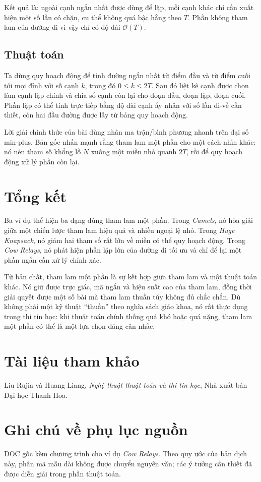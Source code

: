 \documentclass[11pt]{article}
\newcommand{\Oh}{\mathcal{O}}
\begin{document}
Kết quả là: ngoài cạnh ngắn nhất được dùng để lặp, mỗi cạnh khác chỉ cần xuất
hiện một số lần có chặn, cụ thể không quá bậc hằng theo \(T\). Phần không
tham lam của đường đi vì vậy chỉ có độ dài \(\Oh(T)\).

\subsection{Thuật toán}

Ta dùng quy hoạch động để tính đường ngắn nhất từ điểm đầu và từ điểm cuối
tới mọi đỉnh với số cạnh \(k\), trong đó \(0\le k\le 2T\). Sau đó liệt kê
cạnh được chọn làm cạnh lặp chính và chia số cạnh còn lại cho đoạn đầu, đoạn
lặp, đoạn cuối. Phần lặp có thể tính trực tiếp bằng độ dài cạnh ấy nhân với
số lần đi-về cần thiết, còn hai đầu đường được lấy từ bảng quy hoạch động.

Lời giải chính thức của bài dùng nhân ma trận/bình phương nhanh trên đại số
min-plus. Bản gốc nhấn mạnh rằng tham lam một phần cho một cách nhìn khác:
nó nén tham số khổng lồ \(N\) xuống một miền nhỏ quanh \(2T\), rồi để quy
hoạch động xử lý phần còn lại.

\section{Tổng kết}

Ba ví dụ thể hiện ba dạng dùng tham lam một phần. Trong \textit{Camels}, nó
hòa giải giữa một chiến lược tham lam hiệu quả và nhiều ngoại lệ nhỏ. Trong
\textit{Huge Knapsack}, nó giảm hai tham số rất lớn về miền có thể quy hoạch
động. Trong \textit{Cow Relays}, nó phát hiện phần lặp lớn của đường đi tối ưu
và chỉ để lại một phần ngắn cần xử lý chính xác.

Từ bản chất, tham lam một phần là sự kết hợp giữa tham lam và một thuật toán
khác. Nó giữ được trực giác, mã ngắn và hiệu suất cao của tham lam, đồng thời
giải quyết được một số bài mà tham lam thuần túy không đủ chắc chắn. Dù không
phải một kỹ thuật ``thuần'' theo nghĩa sách giáo khoa, nó rất thực dụng trong
thi tin học: khi thuật toán chính thống quá khó hoặc quá nặng, tham lam một
phần có thể là một lựa chọn đáng cân nhắc.

\section*{Tài liệu tham khảo}

Liu Rujia và Huang Liang, \emph{Nghệ thuật thuật toán và thi tin học}, Nhà
xuất bản Đại học Thanh Hoa.

\section*{Ghi chú về phụ lục nguồn}

DOC gốc kèm chương trình cho ví dụ \textit{Cow Relays}. Theo quy ước của bản
dịch này, phần mã mẫu dài không được chuyển nguyên văn; các ý tưởng cần thiết
đã được diễn giải trong phần thuật toán.
\end{document}
